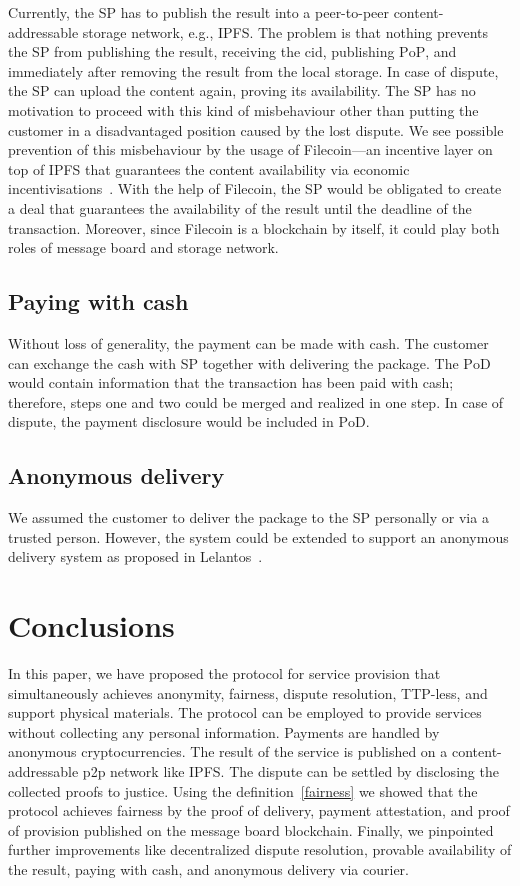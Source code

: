 \documentclass{ieeeaccess}
\begin{document}
Currently, the SP has to publish the result into a peer-to-peer content-addressable storage network, e.g., IPFS. The problem is that nothing prevents the SP from publishing the result, receiving the $\mathrm{cid}$, publishing $\mathrm{PoP}$, and immediately after removing the result from the local storage. In case of dispute, the SP can upload the content again, proving its availability. The SP has no motivation to proceed with this kind of misbehaviour other than putting the customer in a disadvantaged position caused by the lost dispute. We see possible prevention of this misbehaviour by the usage of Filecoin—an incentive layer on top of IPFS that guarantees the content availability via economic incentivisations~\cite{benetfilecoin}. With the help of Filecoin, the SP would be obligated to create a deal that guarantees the availability of the result until the deadline of the transaction. Moreover, since Filecoin is a blockchain by itself, it could play both roles of message board and storage network.

\subsection{Paying with cash}\label{paying-with-cash}

Without loss of generality, the payment can be made with cash. The customer can exchange the cash with SP together with delivering the package. The $\mathrm{PoD}$ would contain information that the transaction has been paid with cash; therefore, steps one and two could be merged and realized in one step. In case of dispute, the payment disclosure would be included in $\mathrm{PoD}$.

\subsection{Anonymous delivery}\label{anonymous-delivery}

We assumed the customer to deliver the package to the SP personally or via a trusted person. However, the system could be extended to support an anonymous delivery system as proposed in Lelantos~\cite{altawy2017lelantos}.

\section{Conclusions}\label{sec:conclusion}
In this paper, we have proposed the protocol for service provision that simultaneously achieves anonymity, fairness, dispute resolution, TTP-less, and support physical materials. The protocol can be employed to provide services without collecting any personal information. Payments are handled by anonymous cryptocurrencies. The result of the service is published on a content-addressable p2p network like IPFS. The dispute can be settled by disclosing the collected proofs to justice. 
Using the definition~\ref{fairness} we showed that the protocol achieves fairness by the proof of delivery, payment attestation, and proof of provision published on the message board blockchain. Finally, we pinpointed further improvements like decentralized dispute resolution, provable availability of the result, paying with cash, and anonymous delivery via courier.
\end{document}
